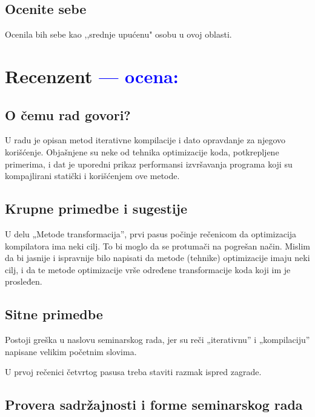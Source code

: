 \documentclass[a4paper]{report}
\newcommand{\odgovor}[1]{\textcolor{blue}{#1}}
\begin{document}
\section{Ocenite sebe}
Ocenila bih sebe kao ,,srednje upućenu" osobu u ovoj oblasti.


\chapter{Recenzent \odgovor{--- ocena:} }


\section{O čemu rad govori?}
U radu je opisan metod iterativne kompilacije i dato opravdanje za njegovo korišćenje. Objašnjene su neke od tehnika optimizacije koda, potkrepljene primerima, i dat je uporedni prikaz performansi izvršavanja programa koji su kompajlirani statički i korišćenjem ove metode. 

\section{Krupne primedbe i sugestije}
 

U delu „Metode transformacija”, prvi pasus počinje rečenicom da optimizacija kompilatora ima neki cilj. To bi moglo da se protumači na pogrešan način. Mislim da bi jasnije i ispravnije bilo napisati da metode (tehnike) optimizacije imaju neki cilj, i da te metode optimizacije vrše određene transformacije koda koji im je prosleđen.

\section{Sitne primedbe}
Postoji greška u naslovu seminarskog rada, jer su reči „iterativnu” i „kompilaciju” napisane velikim početnim slovima.

U prvoj rečenici četvrtog pasusa treba staviti razmak ispred zagrade.

\section{Provera sadržajnosti i forme seminarskog rada}
\end{document}
